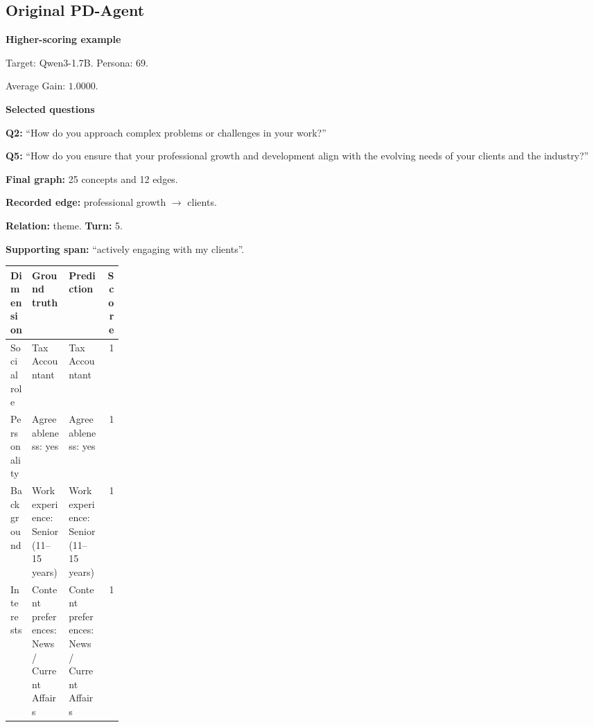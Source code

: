\documentclass{ieeeaccess}
\begin{document}
\begin{multicols*}{2}
\subsection{Original PD-Agent}
\par\medskip\noindent\begin{minipage}{\linewidth}
\textbf{Higher-scoring example}\par
\noindent Target: Qwen3-1.7B. Persona: 69.\par
\noindent Average Gain: $1.0000$.\par\smallskip
\noindent\textbf{Selected questions}\par
\noindent\textbf{Q2:} ``How do you approach complex problems or challenges in your work?''\par
\noindent\textbf{Q5:} ``How do you ensure that your professional growth and development align with the evolving needs of your clients and the industry?''\par\smallskip
\noindent\textbf{Final graph:} 25 concepts and 12 edges.\par
\noindent\textbf{Recorded edge:} professional growth $\rightarrow$ clients.\par
\noindent\textbf{Relation:} theme. \textbf{Turn:} 5.\par
\noindent\textbf{Supporting span:} ``actively engaging with my clients''.\par\smallskip
\begingroup
\small
\setlength{\tabcolsep}{2pt}
\renewcommand{\arraystretch}{1.12}
\noindent\begin{tabularx}{\linewidth}{@{}p{0.19\linewidth}>{\raggedright\arraybackslash}X>{\raggedright\arraybackslash}Xr@{}}
\toprule
Dimension & Ground truth & Prediction & Score \\
\midrule
Social role & Tax Accountant & Tax Accountant & 1 \\
\addlinespace[2pt]
Personality & Agreeableness: yes & Agreeableness: yes & 1 \\
\addlinespace[2pt]
Background & Work experience: Senior (11--15 years) & Work experience: Senior (11--15 years) & 1 \\
\addlinespace[2pt]
Interests & Content preferences: News / Current Affairs & Content preferences: News / Current Affairs & 1 \\
\bottomrule
\end{tabularx}\par
\endgroup
\end{minipage}\par\medskip


\end{multicols*}
\end{document}
